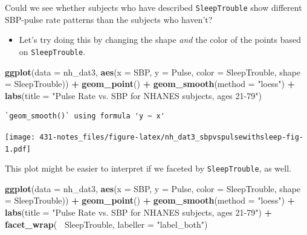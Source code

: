 \documentclass[
]{book}
\newenvironment{Shaded}{\begin{snugshade}}{\end{snugshade}}
\newcommand{\DataTypeTok}[1]{\textcolor[rgb]{0.13,0.29,0.53}{#1}}
\newcommand{\KeywordTok}[1]{\textcolor[rgb]{0.13,0.29,0.53}{\textbf{#1}}}
\newcommand{\NormalTok}[1]{#1}
\newcommand{\OperatorTok}[1]{\textcolor[rgb]{0.81,0.36,0.00}{\textbf{#1}}}
\newcommand{\StringTok}[1]{\textcolor[rgb]{0.31,0.60,0.02}{#1}}
\providecommand{\tightlist}{%
  \setlength{\itemsep}{0pt}\setlength{\parskip}{0pt}}
\begin{document}
Could we see whether subjects who have described \texttt{SleepTrouble} show different SBP-pulse rate patterns than the subjects who haven't?

\begin{itemize}
\tightlist
\item
  Let's try doing this by changing the shape \emph{and} the color of the points based on \texttt{SleepTrouble}.
\end{itemize}

\begin{Shaded}
\begin{Highlighting}[]
\KeywordTok{ggplot}\NormalTok{(}\DataTypeTok{data =}\NormalTok{ nh_dat3, }
       \KeywordTok{aes}\NormalTok{(}\DataTypeTok{x =}\NormalTok{ SBP, }\DataTypeTok{y =}\NormalTok{ Pulse, }
           \DataTypeTok{color =}\NormalTok{ SleepTrouble, }\DataTypeTok{shape =}\NormalTok{ SleepTrouble)) }\OperatorTok{+}
\StringTok{    }\KeywordTok{geom_point}\NormalTok{() }\OperatorTok{+}
\StringTok{    }\KeywordTok{geom_smooth}\NormalTok{(}\DataTypeTok{method =} \StringTok{"loess"}\NormalTok{) }\OperatorTok{+}
\StringTok{    }\KeywordTok{labs}\NormalTok{(}\DataTypeTok{title =} \StringTok{"Pulse Rate vs. SBP for NHANES subjects, ages 21-79"}\NormalTok{)}
\end{Highlighting}
\end{Shaded}

\begin{verbatim}
`geom_smooth()` using formula 'y ~ x'
\end{verbatim}

\texttt{[image: 431-notes\_files/figure-latex/nh\_dat3\_sbpvspulsewithsleep-fig-1.pdf]}

This plot might be easier to interpret if we faceted by \texttt{SleepTrouble}, as well.

\begin{Shaded}
\begin{Highlighting}[]
\KeywordTok{ggplot}\NormalTok{(}\DataTypeTok{data =}\NormalTok{ nh_dat3, }
       \KeywordTok{aes}\NormalTok{(}\DataTypeTok{x =}\NormalTok{ SBP, }\DataTypeTok{y =}\NormalTok{ Pulse, }
           \DataTypeTok{color =}\NormalTok{ SleepTrouble, }\DataTypeTok{shape =}\NormalTok{ SleepTrouble)) }\OperatorTok{+}
\StringTok{    }\KeywordTok{geom_point}\NormalTok{() }\OperatorTok{+}
\StringTok{    }\KeywordTok{geom_smooth}\NormalTok{(}\DataTypeTok{method =} \StringTok{"loess"}\NormalTok{) }\OperatorTok{+}
\StringTok{    }\KeywordTok{labs}\NormalTok{(}\DataTypeTok{title =} \StringTok{"Pulse Rate vs. SBP for NHANES subjects, ages 21-79"}\NormalTok{) }\OperatorTok{+}
\StringTok{    }\KeywordTok{facet_wrap}\NormalTok{(}\OperatorTok{~}\StringTok{ }\NormalTok{SleepTrouble, }\DataTypeTok{labeller =} \StringTok{"label_both"}\NormalTok{)}
\end{Highlighting}
\end{Shaded}
\end{document}
